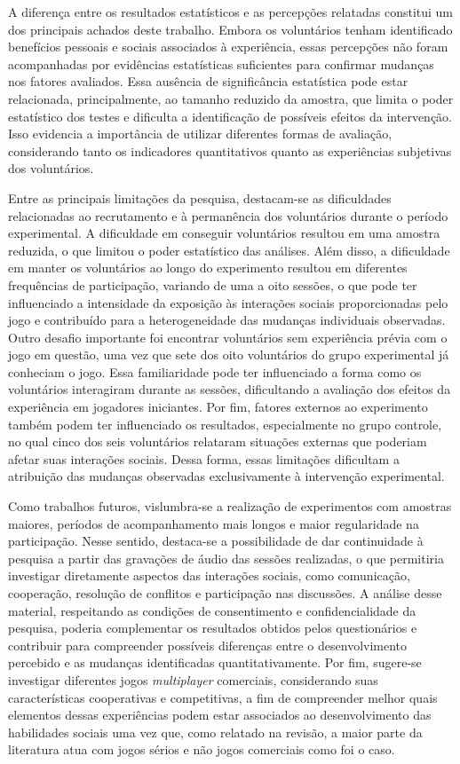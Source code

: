 A diferença entre os resultados estatísticos e as percepções relatadas constitui um dos principais achados deste trabalho. Embora os voluntários tenham identificado benefícios pessoais e sociais associados à experiência, essas percepções não foram acompanhadas por evidências estatísticas suficientes para confirmar mudanças nos fatores avaliados. Essa ausência de significância estatística pode estar relacionada, principalmente, ao tamanho reduzido da amostra, que limita o poder estatístico dos testes e dificulta a identificação de possíveis efeitos da intervenção. Isso evidencia a importância de utilizar diferentes formas de avaliação, considerando tanto os indicadores quantitativos quanto as experiências subjetivas dos voluntários.

Entre as principais limitações da pesquisa, destacam-se as dificuldades relacionadas ao recrutamento e à permanência dos voluntários durante o período experimental. A dificuldade em conseguir voluntários resultou em uma amostra reduzida, o que limitou o poder estatístico das análises. Além disso, a dificuldade em manter os voluntários ao longo do experimento resultou em diferentes frequências de participação, variando de uma a oito sessões, o que pode ter influenciado a intensidade da exposição às interações sociais proporcionadas pelo jogo e contribuído para a heterogeneidade das mudanças individuais observadas. Outro desafio importante foi encontrar voluntários sem experiência prévia com o jogo em questão, uma vez que sete dos oito voluntários do grupo experimental já conheciam o jogo. Essa familiaridade pode ter influenciado a forma como os voluntários interagiram durante as sessões, dificultando a avaliação dos efeitos da experiência em jogadores iniciantes. Por fim, fatores externos ao experimento também podem ter influenciado os resultados, especialmente no grupo controle, no qual cinco dos seis voluntários relataram situações externas que poderiam afetar suas interações sociais. Dessa forma, essas limitações dificultam a atribuição das mudanças observadas exclusivamente à intervenção experimental.

Como trabalhos futuros, vislumbra-se a realização de experimentos com amostras maiores, períodos de acompanhamento mais longos e maior regularidade na participação. Nesse sentido, destaca-se a possibilidade de dar continuidade à pesquisa a partir das gravações de áudio das sessões realizadas, o que permitiria investigar diretamente aspectos das interações sociais, como comunicação, cooperação, resolução de conflitos e participação nas discussões. A análise desse material, respeitando as condições de consentimento e confidencialidade da pesquisa, poderia complementar os resultados obtidos pelos questionários e contribuir para compreender possíveis diferenças entre o desenvolvimento percebido e as mudanças identificadas quantitativamente. Por fim, sugere-se investigar diferentes jogos \textit{multiplayer} comerciais, considerando suas características cooperativas e competitivas, a fim de compreender melhor quais elementos dessas experiências podem estar associados ao desenvolvimento das habilidades sociais uma vez que, como relatado na revisão, a maior parte da literatura atua com jogos sérios e não jogos comerciais como foi o caso.

